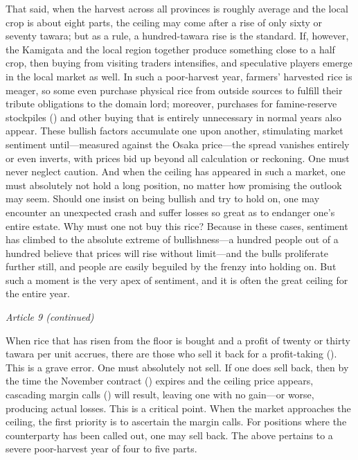 That said, when the harvest across all provinces is roughly average and
the local crop is about eight parts, the ceiling may come after a rise of
only sixty or seventy tawara; but as a rule, a hundred-tawara rise is the
standard. If, however, the Kamigata and the local region together produce
something close to a half crop, then buying from visiting traders
intensifies, and speculative players emerge in the local market as well.
In such a poor-harvest year, farmers' harvested rice is meager, so some
even purchase physical rice from outside sources to fulfill their tribute
obligations to the domain lord; moreover, purchases for famine-reserve
stockpiles () and other buying that
is entirely unnecessary in normal years also appear. These bullish
factors accumulate one upon another, stimulating market sentiment
until---measured against the Osaka price---the spread vanishes entirely or
even inverts, with prices bid up beyond all calculation or reckoning. One
must never neglect caution. And when the ceiling has appeared in such a
market, one must absolutely not hold a long position, no matter how
promising the outlook may seem. Should one insist on being bullish and
try to hold on, one may encounter an unexpected crash and suffer losses so
great as to endanger one's entire estate. Why must one not buy this rice?
Because in these cases, sentiment has climbed to the absolute extreme of
bullishness---a hundred people out of a hundred believe that prices will
rise without limit---and the bulls proliferate further still, and people
are easily beguiled by the frenzy into holding on. But such a moment is
the very apex of sentiment, and it is often the great ceiling for the
entire year.

\begin{sokyubox}
{\small\itshape\color{sokyubar} Article 9 (continued)}

\medskip
When rice that has risen from the floor is bought and a profit of twenty
or thirty tawara per unit accrues, there are those who sell it back for a
profit-taking (). This is a grave error. One must
absolutely not sell. If one does sell back, then by the time the November
contract () expires and the ceiling price appears,
cascading margin calls () will result, leaving one
with no gain---or worse, producing actual losses. This is a critical
point. When the market approaches the ceiling, the first priority is to
ascertain the margin calls. For positions where the counterparty has been
called out, one may sell back. The above pertains to a severe
poor-harvest year of four to five parts.
\end{sokyubox}

